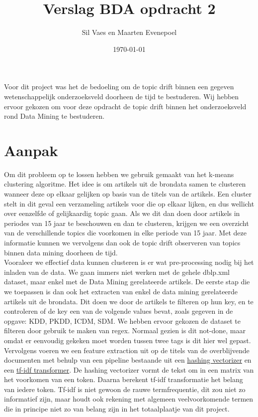 \documentclass[a4paper,fontsize=11pt]{article}
\author{Sil Vaes en Maarten Evenepoel}
\date{\today}
\title{Verslag BDA opdracht 2}
\begin{document}
\maketitle
\setlength\parindent{0pt}

Voor dit project was het de bedoeling om de topic drift binnen een gegeven wetenschappelijk onderzoeksveld doorheen de tijd te bestuderen. Wij hebben ervoor gekozen om voor deze opdracht de topic drift binnen het onderzoeksveld rond Data Mining te bestuderen. 

\section{Aanpak}

Om dit probleem op te lossen hebben we gebruik gemaakt van het k-means clustering algoritme. Het idee is om artikels uit de brondata samen te clusteren wanneer deze op elkaar gelijken op basis van de titels van de artikels. Een cluster stelt in dit geval een verzameling artikels voor die op elkaar lijken, en dus wellicht over eenzelfde of gelijkaardig topic gaan. Als we dit dan doen door artikels in periodes van 15 jaar te beschouwen en dan te clusteren, krijgen we een overzicht van de verschillende topics die voorkomen in elke periode van 15 jaar. Met deze informatie kunnen we vervolgens dan ook de topic drift observeren van topics binnen data mining doorheen de tijd. \\

Vooraleer we effectief data kunnen clusteren is er wat pre-processing nodig bij het inladen van de data. We gaan immers niet werken met de gehele dblp.xml dataset, maar enkel met de Data Mining gerelateerde artikels. De eerste stap die we toepassen is dan ook het extracten van enkel de data mining gerelateerde artikels uit de brondata. Dit doen we door de artikels te filteren op hun key, en te controleren of de key een van de volgende values bevat, zoals gegeven in de opgave: KDD, PKDD, ICDM, SDM. We hebben ervoor gekozen de dataset te filteren door gebruik te maken van regex. Normaal gezien is dit not-done, maar omdat er eenvoudig gekeken moet worden tussen twee tags is dit hier wel gepast.\\

Vervolgens voeren we een feature extraction uit op de titels van de overblijvende documenten met behulp van een pipeline bestaande uit een \hyperlink{https://scikit-learn.org/stable/modules/generated/sklearn.feature_extraction.text.HashingVectorizer.html}{hashing vectorizer} en een \hyperlink{https://scikit-learn.org/stable/modules/generated/sklearn.feature_extraction.text.TfidfTransformer.html}{tf-idf transformer}. De hashing vectorizer vormt de tekst om in een matrix van het voorkomen van een token. Daarna berekent tf-idf transformatie het belang van iedere token. Tf-idf is niet gewoon de rauwe termfrequentie, dit zou niet zo informatief zijn, maar houdt ook rekening met algemeen veelvoorkomende termen die in principe niet zo van belang zijn in het totaalplaatje van dit project. \\
\end{document}
